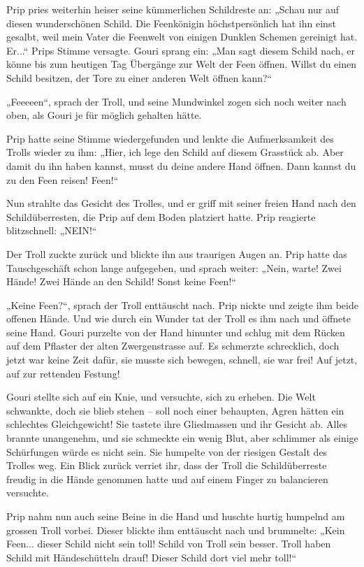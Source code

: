 Prip pries weiterhin heiser seine kümmerlichen Schildreste an: „Schau nur auf diesen wunderschönen Schild. Die Feenkönigin höchstpersönlich hat ihn einst gesalbt, weil mein Vater die Feenwelt von einigen Dunklen Schemen gereinigt hat. Er...“ Prips Stimme versagte. Gouri sprang ein: „Man sagt diesem Schild nach, er könne bis zum heutigen Tag Übergänge zur Welt der Feen öffnen. Willst du einen Schild besitzen, der Tore zu einer anderen Welt öffnen kann?“

„Feeeeen“, sprach der Troll, und seine Mundwinkel zogen sich noch weiter nach oben, als Gouri je für möglich gehalten hätte.

Prip hatte seine Stimme wiedergefunden und lenkte die Aufmerksamkeit des Trolls wieder zu ihm: „Hier, ich lege den Schild auf diesem Grasstück ab. Aber damit du ihn haben kannst, musst du deine andere Hand öffnen. Dann kannst du zu den Feen reisen! Feen!“

Nun strahlte das Gesicht des Trolles, und er griff mit seiner freien Hand nach den Schildüberresten, die Prip auf dem Boden platziert hatte. Prip reagierte blitzschnell: „NEIN!“

Der Troll zuckte zurück und blickte ihn aus traurigen Augen an. Prip hatte das Tauschgeschäft schon lange aufgegeben, und sprach weiter: „Nein, warte! Zwei Hände! Zwei Hände an den Schild! Sonst keine Feen!“

„Keine Feen?“, sprach der Troll enttäuscht nach. Prip nickte und zeigte ihm beide offenen Hände. Und wie durch ein Wunder tat der Troll es ihm nach und öffnete seine Hand. Gouri purzelte von der Hand hinunter und schlug mit dem Rücken auf dem Pflaster der alten Zwergenstrasse auf. Es schmerzte schrecklich, doch jetzt war keine Zeit dafür, sie musste sich bewegen, schnell, sie war frei! Auf jetzt, auf zur rettenden Festung!

Gouri stellte sich auf ein Knie, und versuchte, sich zu erheben. Die Welt schwankte, doch sie blieb stehen – soll noch einer behaupten, Agren hätten ein schlechtes Gleichgewicht! Sie tastete ihre Gliedmassen und ihr Gesicht ab. Alles brannte unangenehm, und sie schmeckte ein wenig Blut, aber schlimmer als einige Schürfungen würde es nicht sein. Sie humpelte von der riesigen Gestalt des Trolles weg. Ein Blick zurück verriet ihr, dass der Troll die Schildüberreste freudig in die Hände genommen hatte und auf einem Finger zu balancieren versuchte.

Prip nahm nun auch seine Beine in die Hand und huschte hurtig humpelnd am grossen Troll vorbei. Dieser blickte ihm enttäuscht nach und brummelte: „Kein Feen... dieser Schild nicht sein toll! Schild von Troll sein besser. Troll haben Schild mit Händeschütteln drauf! Dieser Schild dort viel mehr toll!“

